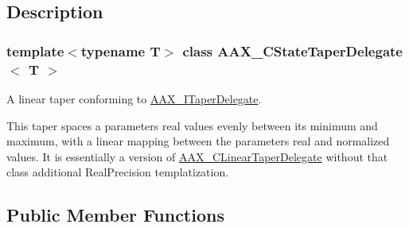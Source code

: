 \subsection{Description}
\subsubsection*{template$<$typename T$>$\newline
class A\+A\+X\+\_\+\+C\+State\+Taper\+Delegate$<$ T $>$}

A linear taper conforming to \mbox{\hyperlink{a01881}{A\+A\+X\+\_\+\+I\+Taper\+Delegate}}. 

This taper spaces a parameter\textquotesingle{}s real values evenly between its minimum and maximum, with a linear mapping between the parameter\textquotesingle{}s real and normalized values. It is essentially a version of \mbox{\hyperlink{a01493}{A\+A\+X\+\_\+\+C\+Linear\+Taper\+Delegate}} without that class\textquotesingle{} additional Real\+Precision templatization. \subsection*{Public Member Functions}

